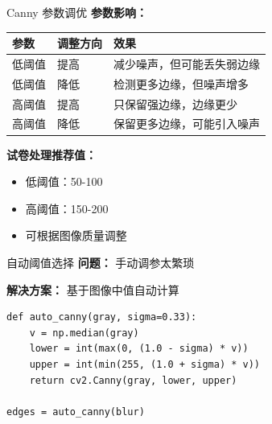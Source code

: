 \begin{frame}[fragile]{Canny 参数调优}
    \textbf{参数影响：}
    \begin{table}
        \centering
        \small
        \begin{tabular}{llp{5cm}}
            \toprule
            \textbf{参数} & \textbf{调整方向} & \textbf{效果} \\
            \midrule
            低阈值 & 提高 & 减少噪声，但可能丢失弱边缘 \\
            低阈值 & 降低 & 检测更多边缘，但噪声增多 \\
            高阈值 & 提高 & 只保留强边缘，边缘更少 \\
            高阈值 & 降低 & 保留更多边缘，可能引入噪声 \\
            \bottomrule
        \end{tabular}
    \end{table}

    \textbf{试卷处理推荐值：}
    \begin{itemize}
        \item 低阈值：50-100
        \item 高阈值：150-200
        \item 可根据图像质量调整
    \end{itemize}
\end{frame}

\begin{frame}[fragile]{自动阈值选择}
    \textbf{问题：} 手动调参太繁琐

    \textbf{解决方案：} 基于图像中值自动计算

    \begin{lstlisting}[basicstyle=\ttfamily\small]
def auto_canny(gray, sigma=0.33):
    v = np.median(gray)
    lower = int(max(0, (1.0 - sigma) * v))
    upper = int(min(255, (1.0 + sigma) * v))
    return cv2.Canny(gray, lower, upper)

edges = auto_canny(blur)
    \end{lstlisting}

\end{frame}
